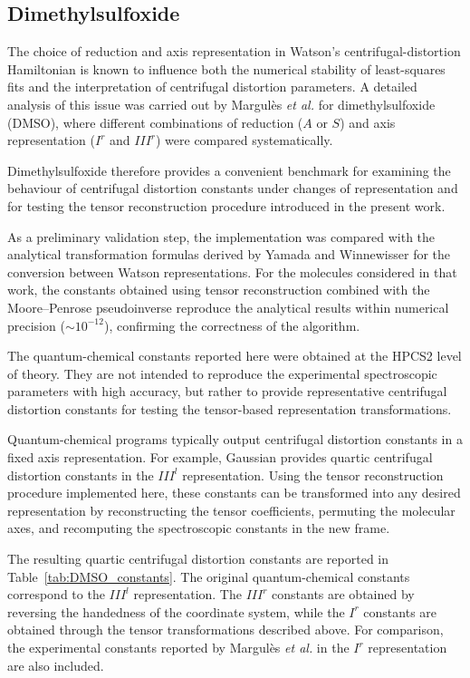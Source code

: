 \subsection{Dimethylsulfoxide}

The choice of reduction and axis representation in Watson's
centrifugal-distortion Hamiltonian is known to influence both the
numerical stability of least-squares fits and the interpretation of
centrifugal distortion parameters.  A detailed analysis of this issue
was carried out by Margul\`es \emph{et al.} for dimethylsulfoxide
(DMSO), where different combinations of reduction ($A$ or $S$) and
axis representation ($I^r$ and $III^r$) were compared
systematically.\cite{Margules2010}

Dimethylsulfoxide therefore provides a convenient benchmark for
examining the behaviour of centrifugal distortion constants under
changes of representation and for testing the tensor reconstruction
procedure introduced in the present work.

As a preliminary validation step, the implementation was compared
with the analytical transformation formulas derived by Yamada and
Winnewisser for the conversion between Watson
representations.\cite{Yamada1976} For the molecules considered in
that work, the constants obtained using tensor reconstruction
combined with the Moore--Penrose pseudoinverse reproduce the
analytical results within numerical precision
($\sim 10^{-12}$), confirming the correctness of the algorithm.

The quantum-chemical constants reported here were obtained at the
HPCS2 level of theory.  They are not intended to reproduce the
experimental spectroscopic parameters with high accuracy, but rather
to provide representative centrifugal distortion constants for
testing the tensor-based representation transformations.

Quantum-chemical programs typically output centrifugal distortion
constants in a fixed axis representation.  For example, Gaussian
provides quartic centrifugal distortion constants in the $III^l$
representation.  Using the tensor reconstruction procedure
implemented here, these constants can be transformed into any desired
representation by reconstructing the tensor coefficients, permuting
the molecular axes, and recomputing the spectroscopic constants in
the new frame.

The resulting quartic centrifugal distortion constants are reported
in Table~\ref{tab:DMSO_constants}.  The original quantum-chemical
constants correspond to the $III^l$ representation.  The $III^r$
constants are obtained by reversing the handedness of the coordinate
system, while the $I^r$ constants are obtained through the tensor
transformations described above.  For comparison, the experimental
constants reported by Margul\`es \emph{et al.} in the $I^r$
representation are also included.\cite{Margules2010}


